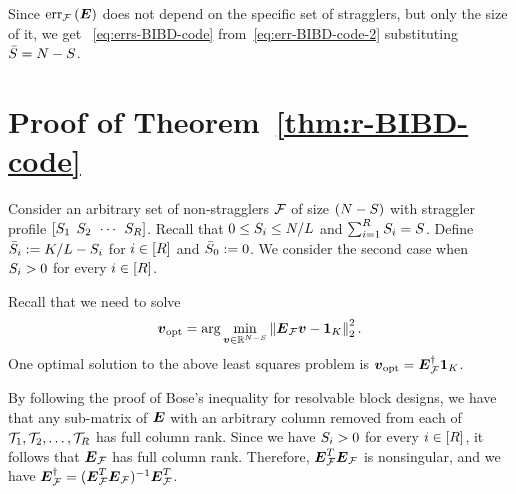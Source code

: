 \documentclass[conference,letterpaper]{IEEEtran}
\begin{document}
Since $\mathrm{err}_{\mathcal{F}}\left(\boldsymbol{E}\right)$ does not depend on the specific set of stragglers, but only the size of it, we get~
\eqref{eq:errs-BIBD-code} from~\eqref{eq:err-BIBD-code-2} substituting $\bar{S} = N - S$.


\section{Proof of Theorem~\ref{thm:r-BIBD-code}}
\label{app:r-BIBD-code}
Consider an arbitrary set of non-stragglers $\mathcal{F}$ of size $(N - S)$ with straggler profile $[S_1 \:\: S_2 \:\: \cdots \:\: S_{R}]$. Recall that $0\leq S_i \leq N/L$ and $\sum_{i=1}^{R}S_i = S$. Define $\bar{S}_i := K/L - S_i$ for $i\in[R]$ and $\bar{S}_0 := 0$. We consider the second case when $S_i > 0$ for every $i\in[R]$. 

Recall that we need to solve
\begin{equation*}
    \label{eq:vopt}
    \boldsymbol{v}_{\mathrm{opt}} = \arg\min_{\boldsymbol{v}\in\mathbb{R}^{N-S}}\left\lVert\boldsymbol{E}_{\mathcal{F}}\boldsymbol{v} - \boldsymbol{1}_{K}\right\rVert_2^2.
\end{equation*}
One optimal solution to the above least squares problem is $\boldsymbol{v}_{\mathrm{opt}} = \boldsymbol{E}_{\mathcal{F}}^{\dagger}\boldsymbol{1}_{K}$.

By following the proof of Bose's inequality for resolvable block designs, we have that any sub-matrix of $\boldsymbol{E}$ with an arbitrary column removed from each of $\mathcal{T}_1,\mathcal{T}_2,\ldots,\mathcal{T}_{R}$ has full column rank. Since we have $S_i > 0$ for every $i\in[R]$, it follows that $\boldsymbol{E}_{\mathcal{F}}$ has full column rank. Therefore, $\boldsymbol{E}_{\mathcal{F}}^T\boldsymbol{E}_{\mathcal{F}}$ is nonsingular, and we have $\boldsymbol{E}_{\mathcal{F}}^{\dagger} = (\boldsymbol{E}_{\mathcal{F}}^T\boldsymbol{E}_{\mathcal{F}})^{-1}\boldsymbol{E}_{\mathcal{F}}^T$. 
\end{document}
